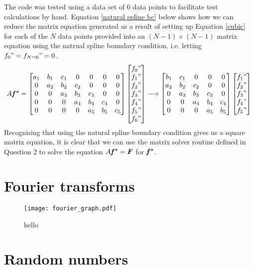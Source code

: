 \documentclass[paper=a4, fontsize=11pt]{scrartcl}
\begin{document}
The code was tested using a data set of $6$ data points to facilitate test calculations by hand. Equation \ref{natural  spline bc} below shows how we can reduce the matrix equation generated as a result of setting up Equation \ref{cubic} for each of the $N$ data points provided into an $(N-1) \times (N-1)$ matrix equation using the natrual spline boundary condition, i.e. letting $f_{0}" = f_{N=6}" = 0$. 
\begin{align}	
\label{natural spline bc}
A \textbf{\textit{f}"} =
\begin{bmatrix}
a_{1} & b_{1} & c_{1} & 0 & 0 & 0 & 0 \\
0 & a_{2} & b_{2} & c_{2} & 0 & 0 & 0\\
0 & 0 & a_{3} & b_{3} & c_{3} &0 & 0\\
0 & 0 & 0 & a_{4} & b_{4} & c_{4} & 0 \\
0 & 0 & 0 & 0 & a_{5} & b_{5} & c_{5}
\end{bmatrix}
\begin{bmatrix}
f_{0}" \\
f_{1}" \\
f_{2}" \\
f_{3}" \\
f_{4}" \\
f_{5}" \\
f_{6}"
\end{bmatrix}
\longrightarrow
\begin{bmatrix}
 b_{1} & c_{1} & 0 & 0 & 0 \\
 a_{2} & b_{2} & c_{2} & 0 & 0\\
 0 & a_{3} & b_{3} & c_{3} &0 \\
 0 & 0 & a_{4} & b_{4} & c_{4} \\
 0 & 0 & 0 & a_{5} & b_{5}
\end{bmatrix}
\begin{bmatrix}
f_{1}" \\
f_{2}" \\
f_{3}" \\
f_{4}" \\
f_{5}" 
\end{bmatrix}
\end{align}
Recognising that using the natural spline boundary condition gives us a square matrix equation, it is clear that we can use the matrix solver routine defined in Question 2 to solve the equation $A\textbf{\textit{f}"} = \textbf{\textit{F}}$ for $\textbf{\textit{f}"}$. 

\section{Fourier transforms}

\begin{figure}
	\centering
	\texttt{[image: fourier\_graph.pdf]}
	\caption{\footnotesize{hello}}
	\label{fourier graph}
\end{figure}

\section{Random numbers}
\end{document}

